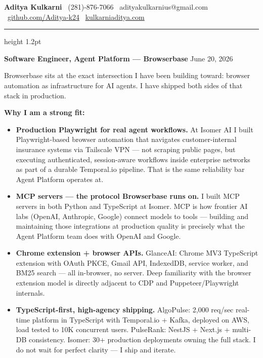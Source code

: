\documentclass[11pt,letterpaper]{article}
\begin{document}
\thispagestyle{empty}

{\large \textbf{Aditya Kulkarni}} \hfill
{\color{BBBlue} \faPhone\ (281)-876-7066} \quad
{\color{BBBlue} \faEnvelope\ adityakulkarnius@gmail.com} \\
{\color{BBBlue} \faGithub\ \href{https://github.com/Aditya-k24}{github.com/Aditya-k24}} \quad
{\color{BBBlue} \faGlobe\ \href{https://www.kulkarniaditya.com}{kulkarniaditya.com}}

\vspace{6pt}
{\color{BBBlue}\hrule height 1.2pt}
\vspace{12pt}

{\color{BBBlue} \textbf{Software Engineer, Agent Platform --- Browserbase}} \hfill June 20, 2026

\vspace{10pt}

Browserbase sits at the exact intersection I have been building toward: browser automation as infrastructure for AI agents. I have shipped both sides of that stack in production.

\vspace{6pt}

\textbf{Why I am a strong fit:}

\begin{itemize}
  \item[\faAngleRight] \textbf{Production Playwright for real agent workflows.} At Isomer AI I built Playwright-based browser automation that navigates customer-internal insurance systems via Tailscale VPN --- not scraping public pages, but executing authenticated, session-aware workflows inside enterprise networks as part of a durable Temporal.io pipeline. That is the same reliability bar Agent Platform operates at.

  \item[\faAngleRight] \textbf{MCP servers --- the protocol Browserbase runs on.} I built MCP servers in both Python and TypeScript at Isomer. MCP is how frontier AI labs (OpenAI, Anthropic, Google) connect models to tools --- building and maintaining those integrations at production quality is precisely what the Agent Platform team does with OpenAI and Google.

  \item[\faAngleRight] \textbf{Chrome extension + browser APIs.} GlanceAI: Chrome MV3 TypeScript extension with OAuth PKCE, Gmail API, IndexedDB, service worker, and BM25 search --- all in-browser, no server. Deep familiarity with the browser extension model is directly adjacent to CDP and Puppeteer/Playwright internals.

  \item[\faAngleRight] \textbf{TypeScript-first, high-agency shipping.} AlgoPulse: 2,000 req/sec real-time platform in TypeScript with Temporal.io + Kafka, deployed on AWS, load tested to 10K concurrent users. PulseRank: NestJS + Next.js + multi-DB consistency. Isomer: 30+ production deployments owning the full stack. I do not wait for perfect clarity --- I ship and iterate.
\end{itemize}
\end{document}
